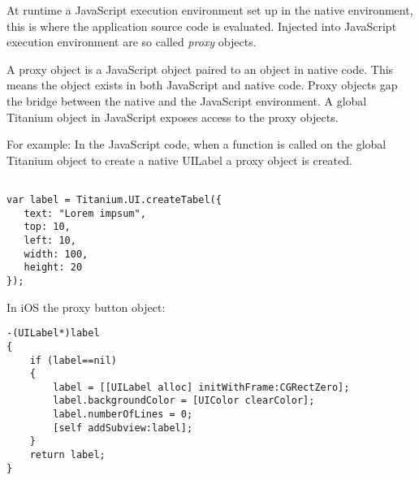 At runtime a JavaScript execution environment set up in the native environment, this is where the application source code is evaluated. Injected into JavaScript execution environment are so called \emph{proxy} objects.

A proxy object is a JavaScript object paired to an object in native code.\cite{Whinnery2012} This means the object exists in both JavaScript and native code. Proxy objects gap the bridge between the native and the JavaScript environment. A global Titanium object in JavaScript exposes access to the proxy objects. 




For example: In the JavaScript code, when a function is called on the global Titanium object to create a native UILabel a proxy object is created.
\  %
\begin{verbatim}

var label = Titanium.UI.createTabel({
   text: "Lorem impsum",
   top: 10,
   left: 10,
   width: 100,
   height: 20
});
\end{verbatim}


In iOS the proxy button object:

\begin{verbatim}
-(UILabel*)label
{
    if (label==nil)
    {
        label = [[UILabel alloc] initWithFrame:CGRectZero];
        label.backgroundColor = [UIColor clearColor];
        label.numberOfLines = 0;
        [self addSubview:label];
    }
    return label;
}
\end{verbatim}

